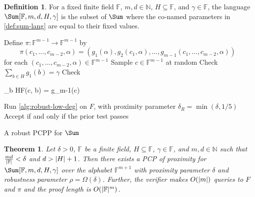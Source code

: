 \documentclass[english,12pt]{reedthesis}
\theoremstyle{plain}
\newtheorem{thm}{Theorem}[section]
\theoremstyle{definition}
\newtheorem{defn}[defn]{Definition}
\theoremstyle{remark}
\DeclarePairedDelimiter{\abs}{\lvert}{\rvert}
\begin{document}
\begin{defn}\label{def:sum-params}
  For a fixed finite field $\mathbb{F}$, $m, d \in \mathbb{N}$, $H \subseteq \mathbb{F}$, and
  $\gamma \in \mathbb{F}$, the language $\Sum[\mathbb{F}, m, d, H, \gamma]$ is the subset of
  $\Sum$ where the co-named parameters in \cref{def:sum-lang} are equal to their
  fixed values.
\end{defn}

\begin{algorithm}[htbp]
  Define $\pi\colon \mathbb{F}^{m-1} \rightarrow \mathbb{F}^{m-1}$ by
  \[
    \pi(c_{1}, \ldots, c_{m-2}, \alpha) = (g_{1}(\alpha), g_{2}(c_{1}, \alpha), \ldots, g_{m-1}(c_{1}, \ldots, c_{m-2}, \alpha))
  \]
  for each $(c_{1}, \ldots, c_{m-2}, \alpha) \in \mathbb{F}^{m-1}$\;
  \KwRet{$\pi$}\;
  Sample $c \in \mathbb{F}^{m-1}$ at random\;
  Check $\sum_{b \in H}g_{1}(b) = \gamma$\;
  Check
  \begin{algomathdisplay}
    \sum_{b \in H}F(c, b) = g_{m-1}(c)
  \end{algomathdisplay}
  Run \cref{alg:robust-low-deg} on $F$, with proximity parameter
  $\delta_{R} = \min(\delta, 1/5)$\;
  Accept if and only if the prior test passes\;
  \caption{A robust PCPP for $\Sum$~\cite[Construction 4.3]{GOS25}}\label{alg:sum-pcpp}
\end{algorithm}

\begin{thm}
  Let $\delta > 0$, $\mathbb{F}$ be a finite field, $H \subseteq \mathbb{F}$,
  $\gamma \in \mathbb{F}$, and $m, d \in \mathbb{N}$ such that $\frac{md}{\abs{\mathbb{F}}} < \delta$
  and $d > \abs{H} + 1$. Then there exists a PCP of
  proximity for $\Sum[\mathbb{F}, m, d, H, \gamma]$ over the alphabet
  $\mathbb{F}^{m+1}$ with proximity parameter $\delta$ and robustness parameter
  $\rho = \Omega(\delta)$. Further, the verifier makes $O(\abs{m})$ queries to $F$ and $\pi$
  and the proof length is $O(\abs{\mathbb{F}}^{m})$.
\end{thm}
\end{document}
